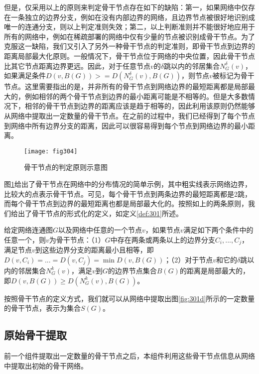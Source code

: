 但是，仅采用以上的原则来判定骨干节点存在如下的缺陷：第一，如果网络中仅存在一条独立的边界分支，例如在没有内部边界的网络，且边界节点被很好地识别成唯一的连通分支，则以上判定准则失效；第二，以上判断准则并不能很好地应用于所有的网络中，例如在稀疏部署的网络中仅有少量的节点被识别成骨干节点。为了克服这一缺陷，我们又引入了另外一种骨干节点的判定准则，即骨干节点到边界的距离局部最大化原则。一般情况下，骨干节点位于网络的中央位置，因此骨干节点比其它节点距离边界更远。因此，对于任意节点$v$的$\delta$跳以内的邻居集合$N_G^{\delta}(v)$，如果满足条件$D(v,B(G))>=D(N_G^{\delta}(v),B(G))$，则节点$v$被标记为骨干节点。这里需要指出的是，并非所有的骨干节点到网络边界的最短距离都是局部最大的，例如相邻的两个骨干节点到边界的最小距离可能是不相等的。但是大多数情况下，相邻的骨干节点到边界的距离应该是趋于相等的，因此利用该原则仍然能够从网络中提取出一定数量的骨干节点。在之前的过程中，我们已经得到了每个节点到网络中所有边界分支的距离，因此可以很容易得到每个节点到网络边界的最小距离。
\begin{figure}[h]
  \centering
  \texttt{[image: fig304]}
  \caption{骨干节点的判定原则示意图}
  \label{fig:304}
\end{figure}

图\ref{fig:304}给出了骨干节点在网络中的分布情况的简单示例，其中粗实线表示网络边界，比较大的点表示骨干节点。可见，每个骨干节点到两条边界的最短距离都是2跳，而每个骨干节点到边界的最短距离也都是局部最大化的。按照如上的两条原则，我们给出了骨干节点的形式化的定义，如定义\ref{def:301}所述。
\begin{definition}\label{def:301}
给定网络连通图$G$以及网络中任意的一个节点$v$，如果节点$v$满足如下两个条件中的任意一个，则$v$为骨干节点：（1）$G$中存在两条或两条以上的边界分支$C_i,...,C_j$，满足节点$v$到这些边界分支的距离最小且相等，即$D(v,C_i)=...=D(v,C_j)=\min{D(v,B(G))}$；（2）对于节点$v$和它的$\delta$跳以内的邻居集合$N_G^k(v)$，满足$v$到$G$的边界节点集合$B(G)$的距离是局部最大的，即$D(v,B(G))\ge{D(N_G^k(v),B(G))}$。
\end{definition}

按照骨干节点的定义方式，我们就可以从网络中提取出图\ref{fig:301d}所示的一定数量的骨干节点，表示为集合$S(G)$。
\subsection{原始骨干提取}
前一个组件提取出一定数量的骨干节点之后，本组件利用这些骨干节点信息从网络中提取出初始的骨干网络。

